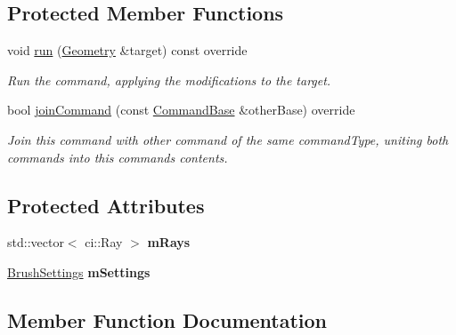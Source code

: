 \subsection*{Protected Member Functions}
\begin{DoxyCompactItemize}
\item 
\mbox{\label{classpepr3d_1_1_cmd_paint_brush_af77ed19d5ba71492a6e513a204b00ba5}} 
void \mbox{\hyperlink{classpepr3d_1_1_cmd_paint_brush_af77ed19d5ba71492a6e513a204b00ba5}{run}} (\mbox{\hyperlink{classpepr3d_1_1_geometry}{Geometry}} \&target) const override
\begin{DoxyCompactList}\small\item\em Run the command, applying the modifications to the target. \end{DoxyCompactList}\item 
bool \mbox{\hyperlink{classpepr3d_1_1_cmd_paint_brush_a05e6c87b7cd47b72150e05f2ee584ee8}{join\+Command}} (const \mbox{\hyperlink{classpepr3d_1_1_command_base}{Command\+Base}} \&other\+Base) override
\begin{DoxyCompactList}\small\item\em Join this command with other command of the same command\+Type, uniting both commands into this command\textquotesingle{}s contents. \end{DoxyCompactList}\end{DoxyCompactItemize}
\subsection*{Protected Attributes}
\begin{DoxyCompactItemize}
\item 
\mbox{\label{classpepr3d_1_1_cmd_paint_brush_a06ebbb4a1031e29a7929dd80c87bcd38}} 
std\+::vector$<$ ci\+::\+Ray $>$ {\bfseries m\+Rays}
\item 
\mbox{\label{classpepr3d_1_1_cmd_paint_brush_a859b62eb61a41ecf2d0c740b3eeecb4f}} 
\mbox{\hyperlink{structpepr3d_1_1_brush_settings}{Brush\+Settings}} {\bfseries m\+Settings}
\end{DoxyCompactItemize}


\subsection{Member Function Documentation}
\mbox{\label{classpepr3d_1_1_cmd_paint_brush_a05e6c87b7cd47b72150e05f2ee584ee8}} 
